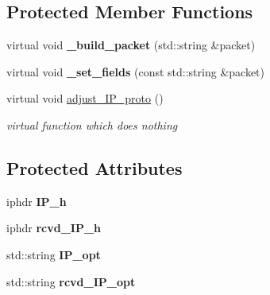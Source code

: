 \subsection*{Protected Member Functions}
\begin{CompactItemize}
\item 
\hypertarget{classsocketpp_1_1IP__RawSocket_6863cc399c543073e9aa3615c3f50940}{
virtual void \textbf{\_\-build\_\-packet} (std::string \&packet)}
\label{classsocketpp_1_1IP__RawSocket_6863cc399c543073e9aa3615c3f50940}

\item 
\hypertarget{classsocketpp_1_1IP__RawSocket_c39832f1ad83184cd5ba94c4c967f465}{
virtual void \textbf{\_\-set\_\-fields} (const std::string \&packet)}
\label{classsocketpp_1_1IP__RawSocket_c39832f1ad83184cd5ba94c4c967f465}

\item 
\hypertarget{classsocketpp_1_1IP__RawSocket_9da491fc93102503788425402d8fd477}{
virtual void \hyperlink{classsocketpp_1_1IP__RawSocket_9da491fc93102503788425402d8fd477}{adjust\_\-IP\_\-proto} ()}
\label{classsocketpp_1_1IP__RawSocket_9da491fc93102503788425402d8fd477}

\begin{CompactList}\small\item\em virtual function which does nothing \item\end{CompactList}\end{CompactItemize}
\subsection*{Protected Attributes}
\begin{CompactItemize}
\item 
\hypertarget{classsocketpp_1_1IP__RawSocket_a8ddf1b2172c1e6f4b50d18c825978dc}{
iphdr \textbf{IP\_\-h}}
\label{classsocketpp_1_1IP__RawSocket_a8ddf1b2172c1e6f4b50d18c825978dc}

\item 
\hypertarget{classsocketpp_1_1IP__RawSocket_005f2299268c452f0e1689d070fa0cab}{
iphdr \textbf{rcvd\_\-IP\_\-h}}
\label{classsocketpp_1_1IP__RawSocket_005f2299268c452f0e1689d070fa0cab}

\item 
\hypertarget{classsocketpp_1_1IP__RawSocket_05761cfc5307ac731cb05fdc0f500469}{
std::string \textbf{IP\_\-opt}}
\label{classsocketpp_1_1IP__RawSocket_05761cfc5307ac731cb05fdc0f500469}

\item 
\hypertarget{classsocketpp_1_1IP__RawSocket_0457fe2b23f01b7304e2bf1441fc7300}{
std::string \textbf{rcvd\_\-IP\_\-opt}}
\label{classsocketpp_1_1IP__RawSocket_0457fe2b23f01b7304e2bf1441fc7300}

\end{CompactItemize}


